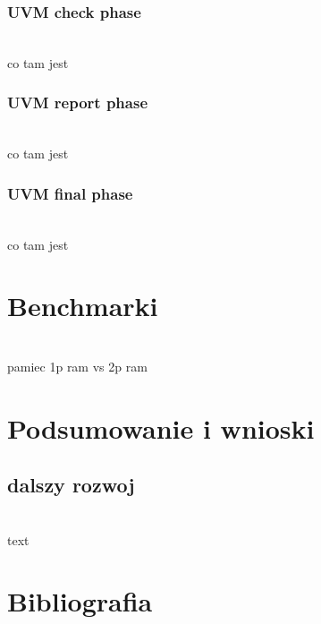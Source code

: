 \documentclass[11pt,a4paper]{article}
\begin{document}
		\subsubsection{UVM check phase}
		\hspace{5mm}
			\\co tam jest	
			
		\subsubsection{UVM report phase}
		\hspace{5mm}
			\\co tam jest	
			
		\subsubsection{UVM final phase}
		\hspace{5mm}
			\\co tam jest	

\newpage
\section{Benchmarki}
\hspace{5mm}
	\\ pamiec 1p ram vs 2p ram

\newpage
\section{Podsumowanie i wnioski}
	\subsection{dalszy rozwoj}
	\hspace{5mm}
		\\text

\newpage

\section{Bibliografia}
\end{document}
